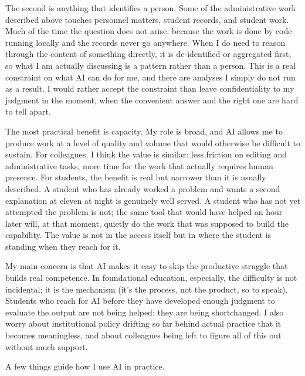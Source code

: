 \documentclass[10pt]{article}
\begin{document}
The second is anything that identifies a person. Some of the administrative work described
above touches personnel matters, student records, and student work. Much of the time the question does not
arise, because the work is done by code running locally and the records never go anywhere. When
I do need to reason through the content of something directly, it is de-identified or aggregated
first, so what I am actually discussing is a pattern rather than a person. This is a real
constraint on what AI can do for me, and there are analyses I simply do
not run as a result. I would rather accept the constraint than leave confidentiality to my
judgment in the moment, when the convenient answer and the right one are hard to tell apart.


The most practical benefit is capacity. My role is broad, and AI allows me to produce work at a
level of quality and volume that would otherwise be difficult to sustain. For colleagues, I
think the value is similar: less friction on editing and administrative tasks, more time for the
work that actually requires human presence. For students, the benefit is real but narrower than it
is usually described. A student who has already worked a problem and wants a second explanation
at eleven at night is genuinely well served. A student who has not yet attempted the problem is
not; the same tool that would have helped an hour later will, at that moment, quietly do the work
that was supposed to build the capability. The value is not in the access itself but in where the
student is standing when they reach for it.


My main concern is that AI makes it easy to skip the productive struggle that builds real
competence. In foundational education, especially, the difficulty is not incidental; it is the
mechanism (it's the process, not the product, so to speak). Students who reach for AI before
they have developed enough judgment to evaluate the output are not being helped; they are being
shortchanged. I also worry about institutional policy drifting so far behind actual practice
that it becomes meaningless, and about colleagues being left to figure all of this out without
much support.


A few things guide how I use AI in practice.
\end{document}
